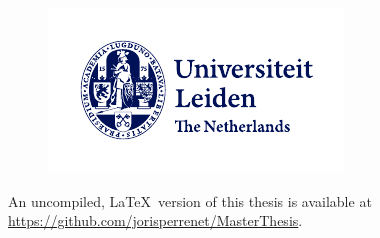 \documentclass[openany, a4paper, 10pt]{book}
\theoremstyle{plain}
\theoremstyle{plain}
\theoremstyle{plain}
\theoremstyle{definition}
\theoremstyle{plain}
\theoremstyle{definition}
\theoremstyle{remark}
\begin{document}
\begin{titlepage}
    \begin{center}
        {\makeatletter
            \fontsize{15}{15}\selectfont{L.J. Perrenet}
        \makeatother}

        \bigskip
        \bigskip
        \bigskip
        {\makeatletter
            \fontsize{20}{20}
        \makeatother}

        \vspace{.8em}
        {\makeatletter
            \fontsize{15}{15}
        \makeatother}

        \bigskip
        \bigskip
        \bigskip
        \bigskip

        {\makeatletter
            \fontsize{15}{15}\selectfont{Master thesis,\\[.5em]Mathematisch Instituut, Universiteit Leiden.}
        \makeatother}

        \bigskip

        {\makeatletter
            \fontsize{15}{15}\selectfont{Supervised by Dr. S.A. Arpin.}
        \makeatother}

        \bigskip
        \bigskip

        {\makeatletter
            \fontsize{15}{15}\selectfont{July 22, 2024.}
        \makeatother}

        \vfill
        \begin{figure}[ht]
            \centering
            \includegraphics[width=.7\textwidth]{../build_plots/leiden_logo}
        \end{figure}
        \bigskip

        An uncompiled, \LaTeX\ version of this thesis is available at \url{https://github.com/jorisperrenet/MasterThesis}.
    \end{center}
\end{titlepage}
\end{document}
